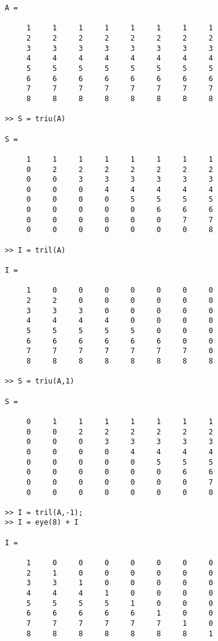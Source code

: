 \begin{enumerate}
\begin{svol}
\begin{codice}
\begin{verbatim}
A =

     1     1     1     1     1     1     1     1
     2     2     2     2     2     2     2     2
     3     3     3     3     3     3     3     3
     4     4     4     4     4     4     4     4
     5     5     5     5     5     5     5     5
     6     6     6     6     6     6     6     6
     7     7     7     7     7     7     7     7
     8     8     8     8     8     8     8     8

>> S = triu(A)

S =

     1     1     1     1     1     1     1     1
     0     2     2     2     2     2     2     2
     0     0     3     3     3     3     3     3
     0     0     0     4     4     4     4     4
     0     0     0     0     5     5     5     5
     0     0     0     0     0     6     6     6
     0     0     0     0     0     0     7     7
     0     0     0     0     0     0     0     8

>> I = tril(A)

I =

     1     0     0     0     0     0     0     0
     2     2     0     0     0     0     0     0
     3     3     3     0     0     0     0     0
     4     4     4     4     0     0     0     0
     5     5     5     5     5     0     0     0
     6     6     6     6     6     6     0     0
     7     7     7     7     7     7     7     0
     8     8     8     8     8     8     8     8

>> S = triu(A,1)

S =

     0     1     1     1     1     1     1     1
     0     0     2     2     2     2     2     2
     0     0     0     3     3     3     3     3
     0     0     0     0     4     4     4     4
     0     0     0     0     0     5     5     5
     0     0     0     0     0     0     6     6
     0     0     0     0     0     0     0     7
     0     0     0     0     0     0     0     0

>> I = tril(A,-1);
>> I = eye(8) + I

I =

     1     0     0     0     0     0     0     0
     2     1     0     0     0     0     0     0
     3     3     1     0     0     0     0     0
     4     4     4     1     0     0     0     0
     5     5     5     5     1     0     0     0
     6     6     6     6     6     1     0     0
     7     7     7     7     7     7     1     0
     8     8     8     8     8     8     8     1


\end{verbatim}
\end{codice}
\end{svol}
\end{enumerate}
